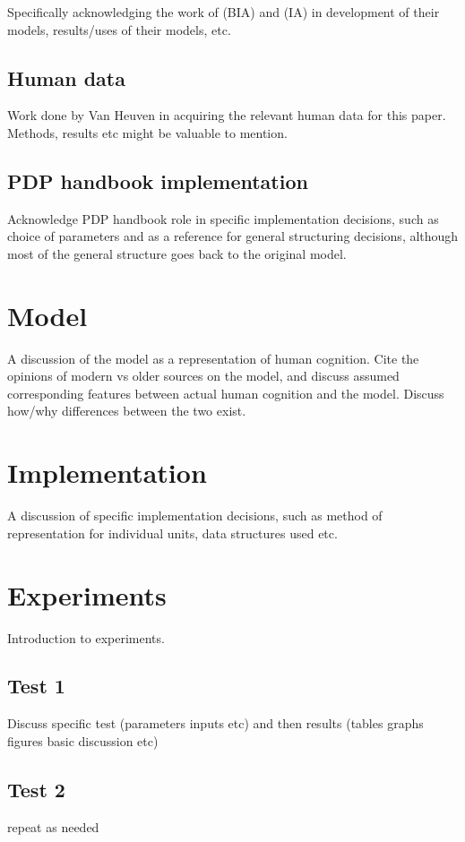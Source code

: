 \documentclass[10pt,letterpaper]{article}
\begin{document}
Specifically acknowledging the work of \cite{DijkstraVanheuven1998a} (BIA) and \cite{MclellandRumelhart1981a} (IA) in development of their models, results/uses of their models, etc. 

\subsection{Human data}

Work done by Van Heuven in acquiring the relevant human data for this paper. Methods, results etc might be valuable to mention.

\subsection{PDP handbook implementation}

Acknowledge PDP handbook role in specific implementation decisions, such as choice of parameters and as a reference for general structuring decisions, although most of the general structure goes back to the original \cite{MclellandRumelhart1981a} model.

\section{Model}

A discussion of the model as a representation of human cognition. Cite the opinions of modern vs older sources on the model, and discuss assumed corresponding features between actual human cognition and the model. Discuss how/why differences between the two exist. 

\section{Implementation}

A discussion of specific implementation decisions, such as method of representation for individual units, data structures used etc.

\section{Experiments}
Introduction to experiments.
\subsection{Test 1}
Discuss specific test (parameters inputs etc) and then results (tables graphs figures basic discussion etc) 
\subsection{Test 2}
repeat as needed
\end{document}

